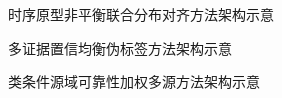 \documentclass[UTF8]{ctexart}
\begin{document}
\begin{figure}[htbp]
    \centering
    \resizebox{\textwidth}{!}{}
    \caption{时序原型非平衡联合分布对齐方法架构示意}
\end{figure}

\newpage

\begin{figure}[htbp]
    \centering
    \resizebox{\textwidth}{!}{}
    \caption{多证据置信均衡伪标签方法架构示意}
\end{figure}

\newpage

\begin{figure}[htbp]
    \centering
    \resizebox{\textwidth}{!}{}
    \caption{类条件源域可靠性加权多源方法架构示意}
\end{figure}
\end{document}
